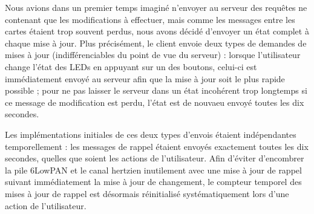 Nous avions dans un premier temps imaginé n’envoyer au serveur des requêtes ne contenant que les modifications à effectuer, mais comme les messages entre les cartes étaient trop souvent perdus, nous avons décidé d’envoyer un état complet à chaque mise à jour.
Plus précisément, le client envoie deux types de demandes de mises à jour (indifférenciables du point de vue du serveur) : lorsque l’utilisateur change l’état des LEDs en appuyant sur un des boutons, celui-ci est immédiatement envoyé au serveur afin que la mise à jour soit le plus rapide possible ; pour ne pas laisser le serveur dans un état incohérent trop longtemps si ce message de modification est perdu, l’état est de nouvaeu envoyé toutes les dix secondes.

Les implémentations initiales de ces deux types d’envois étaient indépendantes temporellement : les messages de rappel étaient envoyés exactement toutes les dix secondes, quelles que soient les actions de l’utilisateur.
Afin d’éviter d’encombrer la pile 6LowPAN et le canal hertzien inutilement avec une mise à jour de rappel suivant immédiatement la mise à jour de changement, le compteur temporel des mises à jour de rappel est désormais réinitialisé systématiquement lors d’une action de l’utilisateur.
